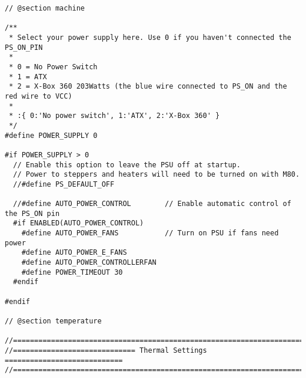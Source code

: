 \begin{lstlisting}[caption = キャプション, label = ラベル]
// @section machine

/**
 * Select your power supply here. Use 0 if you haven't connected the PS_ON_PIN
 *
 * 0 = No Power Switch
 * 1 = ATX
 * 2 = X-Box 360 203Watts (the blue wire connected to PS_ON and the red wire to VCC)
 *
 * :{ 0:'No power switch', 1:'ATX', 2:'X-Box 360' }
 */
#define POWER_SUPPLY 0

#if POWER_SUPPLY > 0
  // Enable this option to leave the PSU off at startup.
  // Power to steppers and heaters will need to be turned on with M80.
  //#define PS_DEFAULT_OFF

  //#define AUTO_POWER_CONTROL        // Enable automatic control of the PS_ON pin
  #if ENABLED(AUTO_POWER_CONTROL)
    #define AUTO_POWER_FANS           // Turn on PSU if fans need power
    #define AUTO_POWER_E_FANS
    #define AUTO_POWER_CONTROLLERFAN
    #define POWER_TIMEOUT 30
  #endif

#endif

// @section temperature

//===========================================================================
//============================= Thermal Settings ============================
//===========================================================================


\end{lstlisting}
